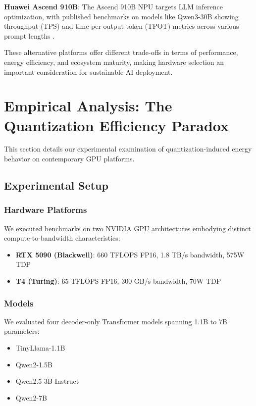 \documentclass[11pt]{article}
\begin{document}
\textbf{Huawei Ascend 910B}: The Ascend 910B NPU targets LLM inference optimization, with published benchmarks on models like Qwen3-30B showing throughput (TPS) and time-per-output-token (TPOT) metrics across various prompt lengths \cite{gpustack2025ascend910b}.

These alternative platforms offer different trade-offs in terms of performance, energy efficiency, and ecosystem maturity, making hardware selection an important consideration for sustainable AI deployment.

\section{Empirical Analysis: The Quantization Efficiency Paradox}
\label{sec:empirical}

This section details our experimental examination of quantization-induced energy behavior on contemporary GPU platforms.

\subsection{Experimental Setup}

\subsubsection{Hardware Platforms}

We executed benchmarks on two NVIDIA GPU architectures embodying distinct compute-to-bandwidth characteristics:

\begin{itemize}
    \item \textbf{RTX 5090 (Blackwell)}: 660 TFLOPS FP16, 1.8 TB/s bandwidth, 575W TDP
    \item \textbf{T4 (Turing)}: 65 TFLOPS FP16, 300 GB/s bandwidth, 70W TDP
\end{itemize}

\subsubsection{Models}

We evaluated four decoder-only Transformer models spanning 1.1B to 7B parameters:
\begin{itemize}
    \item TinyLlama-1.1B
    \item Qwen2-1.5B
    \item Qwen2.5-3B-Instruct
    \item Qwen2-7B
\end{itemize}
\end{document}
